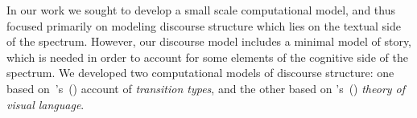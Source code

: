 %
%
%

%
In our work we sought to develop a small scale computational model, and thus
focused primarily on modeling discourse structure which lies on the textual
side of the spectrum. However, our discourse model includes a minimal model of
story, which is needed in order to account for some elements of the cognitive
side of the spectrum.  We developed two computational models of discourse
structure: one based
on~\citeauthor{mcCloud1993understanding}'s~(\citeyear{mcCloud1993understanding})
account of \emph{transition types}, and the other based on
\citeauthor{cohn2013visual}'s~(\citeyear{cohn2013visual}) \emph{theory of visual
language}.




